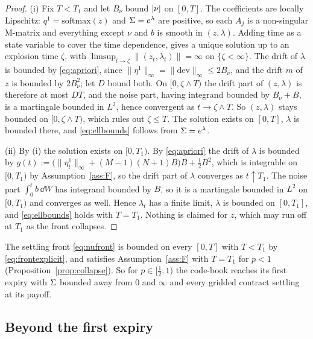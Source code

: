 \begin{proof}
(i) Fix $T<T_1$ and let $B_\nu$ bound $\lvert \nu\rvert$ on $[0,T]$. The coefficients are
locally Lipschitz: $q^1=\mathrm{softmax}(z)$ and $\Sigma=e^\lambda$ are positive, so
each $A_j$ is a non-singular M-matrix and everything except $\nu$ and $b$ is smooth
in $(z,\lambda)$. Adding time as a state variable to cover the time dependence,
\cite[Theorem~V.38, p.~303]{Protter2005} gives a unique solution up to an explosion
time $\zeta$, with $\limsup_{t\to\zeta}\lVert(z_t,\lambda_t)\rVert=\infty$ on
$\{\zeta<\infty\}$. The drift of $\lambda$ is bounded by \eqref{eq:apriori}, since
$\lVert\eta^1\rVert_\infty=\lVert\mathrm{dev}\rVert_\infty\le2B_\nu$, and the drift $m$
of $z$ is bounded by $2B_\nu^2$; let $D$ bound both. On $[0,\zeta\wedge T)$ the drift
part of $(z,\lambda)$ is therefore at most $DT$, and the noise part, having integrand
bounded by $B_\nu+B$, is a martingale bounded in $L^2$, hence convergent as
$t\to\zeta\wedge T$. So $(z,\lambda)$ stays bounded on $[0,\zeta\wedge T)$, which
rules out $\zeta\le T$. The solution exists on $[0,T]$, $\lambda$ is bounded there,
and \eqref{eq:ellbounds} follows from $\Sigma=e^\lambda$.

(ii) By (i) the solution exists on $[0,T_1)$. By \eqref{eq:apriori} the drift of
$\lambda$ is bounded by
$g(t):=\bigl(\lVert\eta^1_t\rVert_\infty+(M-1)(N+1)B\bigr)B+\tfrac12B^2$, which is
integrable on $[0,T_1)$ by Assumption~\ref{ass:F}, so the drift part of $\lambda$
converges as $t\uparrow T_1$. The noise part $\int_0^tb\,\dd W$ has integrand bounded
by $B$, so it is a martingale bounded in $L^2$ on $[0,T_1)$ and converges as well.
Hence $\lambda_t$ has a finite limit, $\lambda$ is bounded on $[0,T_1]$, and
\eqref{eq:ellbounds} holds with $T=T_1$. Nothing is claimed for $z$, which may run off
at $T_1$ as the front collapses.
\end{proof}

The settling front \eqref{eq:nufront} is bounded on every $[0,T]$ with $T<T_1$ by
\eqref{eq:frontexplicit}, and satisfies Assumption~\ref{ass:F} with $T=T_1$ for $p<1$
(Proposition~\ref{prop:collapse}). So for $p\in[\tfrac12,1)$ the code-book reaches its
first expiry with $\Sigma$ bounded away from $0$ and $\infty$ and every gridded contract
settling at its payoff.

\subsection{Beyond the first expiry}\label{sec:patching}

